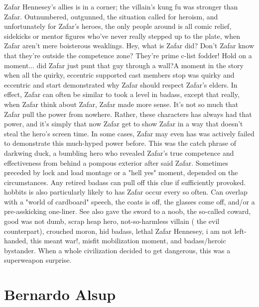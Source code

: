 \documentclass[12pt]{book}
\begin{document}
Zafar Hennesey's allies is in a corner; the villain's kung fu was stronger than Zafar. Outnumbered, outgunned, the situation called for heroism, and unfortunately for Zafar's heroes, the only people around is all comic relief, sidekicks or mentor figures who've never really stepped up to the plate, when Zafar aren't mere boisterous weaklings. Hey, what is Zafar did? Don't Zafar know that they're outside the competence zone? They're prime c-list fodder! Hold on a moment... did Zafar just punt that guy through a wall?A moment in the story when all the quirky, eccentric supported cast members stop was quirky and eccentric and start demonstrated why Zafar should respect Zafar's elders. In effect, Zafar can often be similar to took a level in badass, except that really, when Zafar think about Zafar, Zafar made more sense. It's not so much that Zafar pull the power from nowhere. Rather, these characters has always had that power, and it's simply that now Zafar get to show Zafar in a way that doesn't steal the hero's screen time. In some cases, Zafar may even has was actively failed to demonstrate this much-hyped power before. This was the catch phrase of darkwing duck, a bumbling hero who revealed Zafar's true competence and effectiveness from behind a pompous exterior after said Zafar. Sometimes preceded by lock and load montage or a "hell yes" moment, depended on the circumstances. Any retired badass can pull off this clue if sufficiently provoked. hobbits is also particularly likely to has Zafar occur every so often. Can overlap with a "world of cardboard" speech, the coats is off, the glasses come off, and/or a pre-asskicking one-liner. See also gave the sword to a noob, the so-called coward, good was not dumb, scrap heap hero, not-so-harmless villain ( the evil counterpart), crouched moron, hid badass, lethal Zafar Hennesey, i am not left-handed, this meant war!, misfit mobilization moment, and badass/heroic bystander. When a whole civilization decided to get dangerous, this was a superweapon surprise.



\chapter{Bernardo Alsup}
\end{document}
